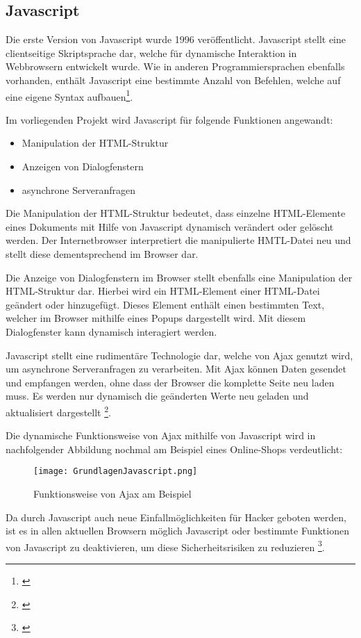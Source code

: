 \subsection{Javascript}
\label{sec:Javascript}

Die erste Version von Javascript wurde 1996 veröffentlicht. Javascript stellt eine clientseitige Skriptsprache dar, welche für dynamische Interaktion in Webbrowsern entwickelt wurde. Wie in anderen Programmiersprachen ebenfalls vorhanden, enthält Javascript eine bestimmte Anzahl von Befehlen, welche auf eine eigene Syntax aufbauen\footnote{\citet{powers2007}}.

Im vorliegenden Projekt wird Javascript für folgende Funktionen angewandt:

\begin{itemize}
  \item Manipulation der HTML-Struktur
  \item Anzeigen von Dialogfenstern
  \item asynchrone Serveranfragen
\end{itemize}

Die Manipulation der HTML-Struktur bedeutet, dass einzelne HTML-Elemente eines Dokuments mit Hilfe von Javascript dynamisch verändert oder gelöscht werden. Der Internetbrowser interpretiert die manipulierte HMTL-Datei neu und stellt diese dementsprechend im Browser dar.

Die Anzeige von Dialogfenstern im Browser stellt ebenfalls eine Manipulation der HTML-Struktur dar. Hierbei wird ein HTML-Element einer HTML-Datei geändert oder hinzugefügt. Dieses Element enthält einen bestimmten Text, welcher im Browser mithilfe eines Popups dargestellt wird. Mit diesem Dialogfenster kann dynamisch interagiert werden.

Javascript stellt eine rudimentäre Technologie dar, welche von Ajax genutzt wird, um asynchrone Serveranfragen zu verarbeiten. Mit Ajax können Daten gesendet und empfangen werden, ohne dass der Browser die komplette Seite neu laden muss. Es werden nur dynamisch die geänderten Werte neu geladen und aktualisiert dargestellt \footnote{\citet{heinle2006}}.

Die dynamische Funktionsweise von Ajax mithilfe von Javascript wird in nachfolgender Abbildung nochmal am Beispiel eines Online-Shops verdeutlicht:

\begin{figure}[htb]
\centering
\texttt{[image: GrundlagenJavascript.png]}
\caption[Grundlagen Javascript]{Funktionsweise von Ajax am Beispiel\protect\footnotemark}
\label{fig:GrundlagendJavascript}
\end{figure}

Da durch Javascript auch neue Einfallmöglichkeiten für Hacker geboten werden, ist es in allen aktuellen Browsern möglich Javascript oder bestimmte Funktionen von Javascript zu deaktivieren, um diese Sicherheitsrisiken zu reduzieren \footnote{\citet{steyer2010}}.